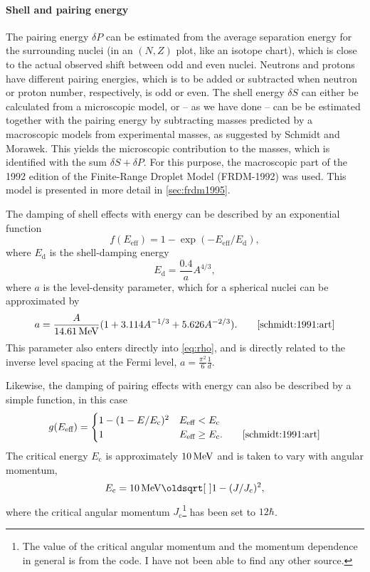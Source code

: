 \paragraph{Shell and pairing energy}
The pairing energy $\delta P$ can be estimated from the average separation energy for the surrounding nuclei (in an $(N,Z)$ plot, like an isotope chart), which is close to the actual observed shift between odd and even nuclei\cite{ericson:1960}. Neutrons and protons have different pairing energies, which is to be added or subtracted when neutron or proton number, respectively, is odd or even. 
The shell energy $\delta S$ can either be calculated from a microscopic model, or -- as we have done -- can be be estimated together with the pairing energy by subtracting masses predicted by a macroscopic models from experimental masses, as suggested by Schmidt and Morawek\cite{schmidt:1991:art}. This yields the microscopic contribution to the masses, which is identified with the sum $\delta S + \delta P$. 
For this purpose, the macroscopic part of the 1992 edition of the Finite-Range Droplet Model (FRDM-1992)\cite{moller1995} was used. This model is presented in more detail in \autoref{sec:frdm1995}.

The damping of shell effects with energy can be described by an exponential function
\begin{equation}
f(E_\text{eff}) = 1-\exp{\left(-E_\text{eff}/E_\text{d}\right)},
\end{equation}
where $E_\text{d}$ is the shell-damping energy 
\begin{equation}
E_\text{d} = \frac{0.4}{a} A^{4/3},
\end{equation}
where $a$ is the level-density parameter, which for a spherical nuclei can be approximated by
\begin{equation}
a=\frac{A}{\unit[14.61]{MeV}}(1+3.114 A^{-1/3} + 5.626 A^{-2/3}).\qquad\cite{schmidt:1991:art}\label{eq:a}
\end{equation}
This parameter also enters directly into \eqref{eq:rho}, and is directly related to the inverse level spacing at the Fermi level, $a=\tfrac{\pi^2}{6} \tfrac{1}{d}$.

Likewise, the damping of pairing effects with energy can also be described by a simple function, in this case
\begin{equation}
g(E_\text{eff}) = \begin{cases} 1-(1-E/E_\text{c})^2 & E_\text{eff} < E_\text{c} \\
 1 & E_\text{eff} \ge E_\text{c}.\qquad\cite{schmidt:1991:art}
\end{cases}
\end{equation}
The critical energy $E_\text{c}$ is approximately $\unit[10]{MeV}$ and is taken to vary with angular momentum, 
\begin{equation}
E_\text{c} = \unit[10]{MeV}\sqrt{1-(J/J_\text{c})^2},
\end{equation}
where the critical angular momentum $J_\text{c}$\footnote{The value of the critical angular momentum and the momentum dependence in general is from the  code. I have not been able to find any other source.}  has been set to $12\hbar$.
